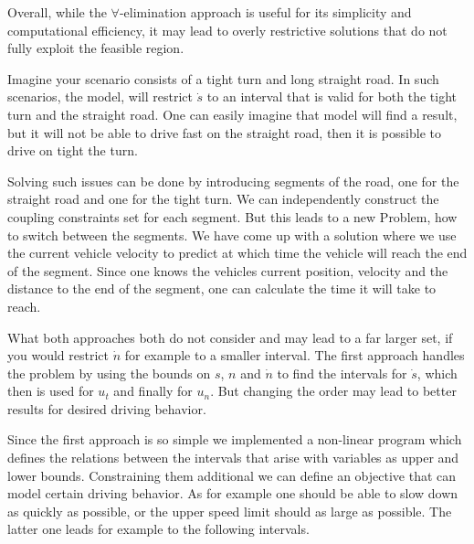Overall, while the $\forall$-elimination approach is useful for its simplicity and computational efficiency, it may lead to overly restrictive
solutions that do not fully exploit the feasible region.

Imagine your scenario consists of a tight turn and long straight road.
In such scenarios, the model, will restrict $\dot{s}$ to an interval that is valid for both the tight turn and the straight road.
One can easily imagine that model will find a result, but it will not be able to drive fast on the straight road, then it is possible to drive on
tight the turn.

Solving such issues can be done by introducing segments of the road, one for the straight road and one for the tight turn.
We can independently construct the coupling constraints set for each segment.
But this leads to a new Problem, how to switch between the segments.
We have come up with a solution where we use the current vehicle velocity to predict at which time the vehicle will reach the end of the segment.
Since one knows the vehicles current position, velocity and the distance to the end of the segment, one can calculate the time it will take to reach.

What both approaches both do not consider and may lead to a far larger set, if you would restrict $\dot{n}$ for example to a smaller interval.
The first approach handles the problem by using the bounds on $s$, $n$ and $\dot{n}$ to find the intervals for $\dot{s}$, which then is used for
$u_t$ and finally for $u_n$.
But changing the order may lead to better results for desired driving behavior.

Since the first approach is so simple we implemented a non-linear program which defines the relations between the intervals that arise with variables
as upper and lower bounds.
Constraining them additional we can define an objective that can model certain driving behavior.
As for example one should be able to slow down as quickly as possible, or the upper speed limit should as large as possible.
The latter one leads for example to the following intervals.

